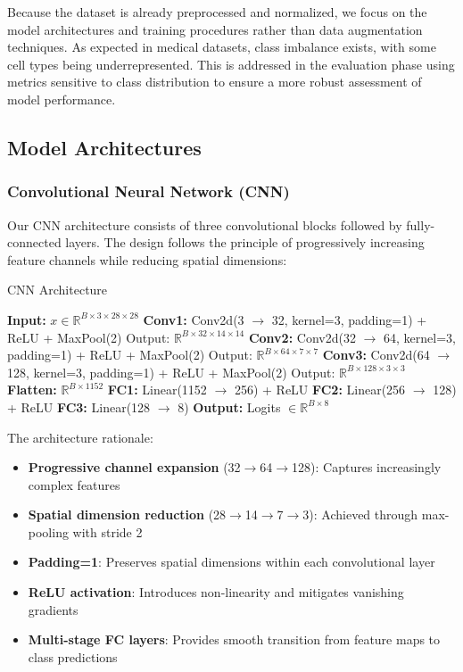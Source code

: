 \documentclass[runningheads]{llncs}
\begin{document}
Because the dataset is already preprocessed and normalized, we focus on the model architectures and training procedures rather than data augmentation techniques.
As expected in medical datasets, class imbalance exists, with some cell types being underrepresented. This is addressed in the evaluation phase using metrics sensitive to class distribution
to ensure a more robust assessment of model performance.
\subsection{Model Architectures}

\subsubsection{Convolutional Neural Network (CNN)}

Our CNN architecture consists of three convolutional blocks followed by fully-connected layers. The design follows the principle of progressively increasing feature channels while reducing spatial dimensions:

\begin{algorithm}
\caption{CNN Architecture}
\begin{algorithmic}[1]
\STATE \textbf{Input:} $x \in \mathbb{R}^{B \times 3 \times 28 \times 28}$
\STATE \textbf{Conv1:} Conv2d(3 $\rightarrow$ 32, kernel=3, padding=1) + ReLU + MaxPool(2)
\STATE \quad Output: $\mathbb{R}^{B \times 32 \times 14 \times 14}$
\STATE \textbf{Conv2:} Conv2d(32 $\rightarrow$ 64, kernel=3, padding=1) + ReLU + MaxPool(2)
\STATE \quad Output: $\mathbb{R}^{B \times 64 \times 7 \times 7}$
\STATE \textbf{Conv3:} Conv2d(64 $\rightarrow$ 128, kernel=3, padding=1) + ReLU + MaxPool(2)
\STATE \quad Output: $\mathbb{R}^{B \times 128 \times 3 \times 3}$
\STATE \textbf{Flatten:} $\mathbb{R}^{B \times 1152}$
\STATE \textbf{FC1:} Linear(1152 $\rightarrow$ 256) + ReLU
\STATE \textbf{FC2:} Linear(256 $\rightarrow$ 128) + ReLU
\STATE \textbf{FC3:} Linear(128 $\rightarrow$ 8)
\STATE \textbf{Output:} Logits $\in \mathbb{R}^{B \times 8}$
\end{algorithmic}
\end{algorithm}

The architecture rationale:
\begin{itemize}
    \item \textbf{Progressive channel expansion} (32$\rightarrow$64$\rightarrow$128): Captures increasingly complex features
    \item \textbf{Spatial dimension reduction} (28$\rightarrow$14$\rightarrow$7$\rightarrow$3): Achieved through max-pooling with stride 2
    \item \textbf{Padding=1}: Preserves spatial dimensions within each convolutional layer
    \item \textbf{ReLU activation}: Introduces non-linearity and mitigates vanishing gradients
    \item \textbf{Multi-stage FC layers}: Provides smooth transition from feature maps to class predictions
\end{itemize}
\end{document}
